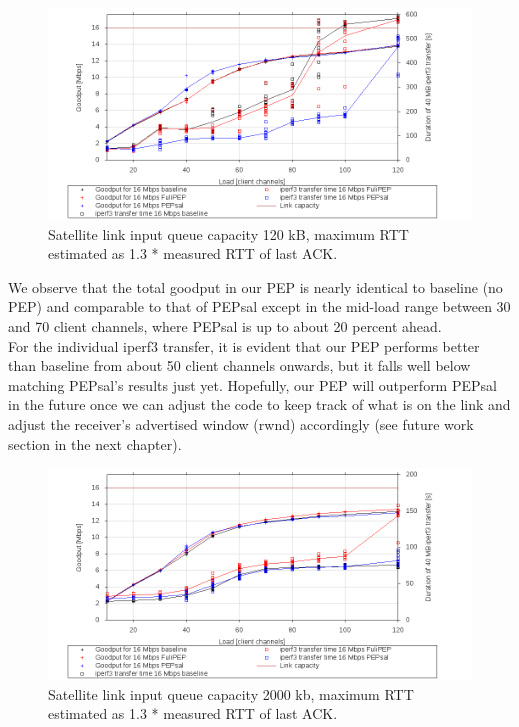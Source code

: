 \documentclass{uathesis}
\begin{document}
\begin{figure}[ht!]
    \centering
    \includegraphics[width=1.1\textwidth]{120K.png}
    \caption{Satellite link input queue capacity 120 kB, maximum RTT estimated as 1.3 * measured RTT of last ACK.}
    \label{fig: 120K queues} 
\end{figure}

We observe that the total goodput in our PEP is nearly identical to baseline (no PEP) and comparable to that of PEPsal except in the mid-load range between 30 and 70 client channels, where PEPsal is up to about 20 percent ahead.\\

For the individual iperf3 transfer, it is evident that our PEP performs better than baseline from about 50 client channels onwards, but it falls well below matching PEPsal's results just yet. Hopefully, our PEP will outperform PEPsal in the future once we can adjust the code to keep track of what is on the link and adjust the receiver's advertised window (rwnd) accordingly (see future work section in the next chapter).\\

\begin{figure}[ht!]
    \centering
    \includegraphics[width=1.1\textwidth]{2000k.png}
    \caption{Satellite link input queue capacity 2000 kb, maximum RTT estimated as 1.3 * measured RTT of last ACK.}
    \label{fig: 2000k} 
\end{figure}
\end{document}
